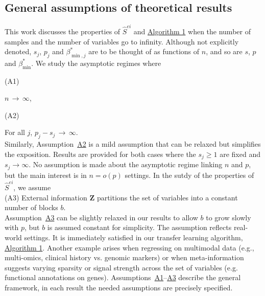 \documentclass[
  12pt]{article}
\newcommand{\bZ}{\boldsymbol{Z}}
\begin{document}
\subsection{General assumptions of theoretical results} 
This work discusses the properties of $\hat{S}^{ei}$ and \hyperlink{lab:AlgoTL}{Algorithm 1} when the number of samples and the number of variables go to infinity. Although not explicitly denoted, $s_j$, $p_j$ and $\beta_{\min,j}^*$ are to be thought of as functions of $n$, and so are $s$, $p$ and $\beta_{\min}^*$. We study the asymptotic regimes where

     \hypertarget{lab:A1}{(A1)}\quad $n \,\to \, \infty$,
     
     \hypertarget{lab:A2}{(A2)}\quad For all $j$, $p_j-s_j \,\to \, \infty$.\\[5pt]
Similarly, Assumption~\hyperlink{lab:A2}{A2} is a mild assumption that can be relaxed but simplifies the exposition. Results are provided for both cases where the $s_j\geq1$ are fixed and $s_j \rightarrow \infty$. No assumption is made about the asymptotic regime linking $n$ and $p$, but the main interest is in $n= o(p)$ settings.
In the sutdy of the properties of $\hat{S}^{ei}$, we assume \\[5pt]
    \hypertarget{lab:A3}{(A3)} \quad  External information $\bZ$ partitions the set of variables into a constant number of blocks $b$.\\[5pt]
Assumption~\hyperlink{lab:A3}{A3} can be slightly relaxed in our results to allow $b$ to grow slowly with $p$, but $b$ is assumed constant for simplicity. The assumption reflects real-world settings. It is immediately satisfied in our transfer learning algorithm, \hyperlink{lab:AlgoTL}{Algorithm 1}. Another example arises when regressing on multimodal data (e.g., multi-omics, clinical history vs. genomic markers) or when meta-information suggests varying sparsity or signal strength across the set of variables (e.g. functional annotations on genes). Assumptions~\hyperlink{lab:A1}{A1}--\hyperlink{lab:A3}{A3} describe the general framework, in each result the needed assumptions are precisely specified.

\end{document}
